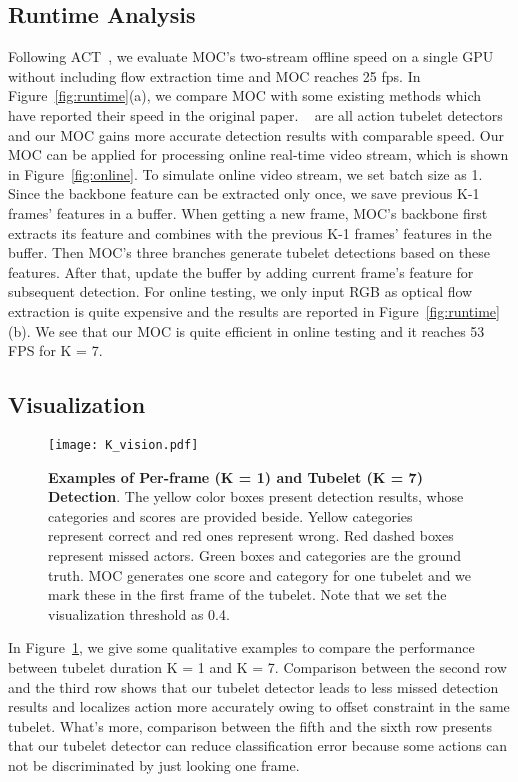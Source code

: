 \documentclass[runningheads]{llncs}
\begin{document}
\subsection{Runtime Analysis}
Following ACT~\cite{kalogeiton2017action}, we evaluate MOC's two-stream offline speed on a single GPU without including flow extraction time and MOC reaches 25 fps. In Figure~\ref{fig:runtime}(a), we compare MOC with some existing methods which have reported their speed in the original paper. ~\cite{yang2019step,zhao2019dance,kalogeiton2017action} are all action tubelet detectors and our MOC gains more accurate detection results with comparable speed.
Our MOC can be applied for processing online real-time video stream, which is shown in Figure~\ref{fig:online}. To simulate online video stream, we set batch size as 1. Since the backbone feature can be extracted only once, we save previous K-1 frames' features in a buffer. When getting a new frame, MOC's backbone first extracts its feature and combines with the previous K-1 frames' features in the buffer. Then MOC's three branches generate tubelet detections based on
these features. After that, update the buffer by adding current frame's feature for subsequent detection.
For online testing, we only input RGB as optical flow extraction is quite expensive and the results are reported in Figure~\ref{fig:runtime}(b).  We see that our MOC is quite efficient in online testing and it reaches 53 FPS for K = 7.

\subsection{Visualization}

\begin{figure}[t]
  \centering
    \texttt{[image: K\_vision.pdf]}
    \caption{{\bf Examples of Per-frame (K = 1) and Tubelet (K = 7) Detection}. The yellow color boxes present detection results, whose categories and scores are provided beside. Yellow categories represent correct and red ones represent wrong. Red dashed boxes represent missed actors. Green boxes and categories are the ground truth. MOC generates one score and category for one tubelet and we mark these in the first frame of the tubelet. Note that we set the visualization threshold as 0.4.}
  \label{fig:K_vision}
\end{figure}

In Figure~\ref{fig:K_vision}, we give some qualitative examples to compare the performance between tubelet duration K = 1 and K = 7. Comparison between the second row and the third row shows that our tubelet detector leads to less missed detection results and localizes action more accurately owing to offset constraint in the same tubelet. What's more, comparison between the fifth and the sixth row presents that our tubelet detector can reduce classification error because some actions can not be discriminated by just looking one frame.
\end{document}
